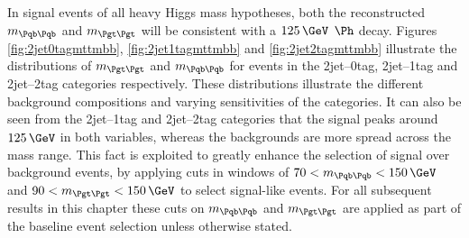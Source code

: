 In signal events of all heavy Higgs mass hypotheses, both the reconstructed $m_{\Pqb\Pqb}$ and
$m_{\Pgt\Pgt}$ will be consistent with a $125\,\GeV$ $\Ph$ decay.
Figures \ref{fig:2jet0tagmttmbb}, \ref{fig:2jet1tagmttmbb} and
\ref{fig:2jet2tagmttmbb} illustrate the distributions of $m_{\Pgt\Pgt}$ and
$m_{\Pqb\Pqb}$ for events in the 2jet--0tag, 2jet--1tag and 2jet--2tag
categories respectively. These distributions
illustrate the different background compositions and varying sensitivities of
the categories. It can also be seen from the 2jet--1tag and 2jet--2tag categories 
that the signal peaks around $125\,\GeV$ in
both variables, whereas the backgrounds are more spread across the mass range. 
This fact is exploited to greatly
enhance the selection of signal over background events, by applying cuts in
windows of $70 < m_{\Pqb\Pqb} < 150\,\GeV$ and $90 < m_{\Pgt\Pgt} < 150\,\GeV$ to
select signal-like events. For all subsequent results in this chapter these cuts
on $m_{\Pqb\Pqb}$ and $m_{\Pgt\Pgt}$ are applied as part of the baseline event
selection unless otherwise stated. 

